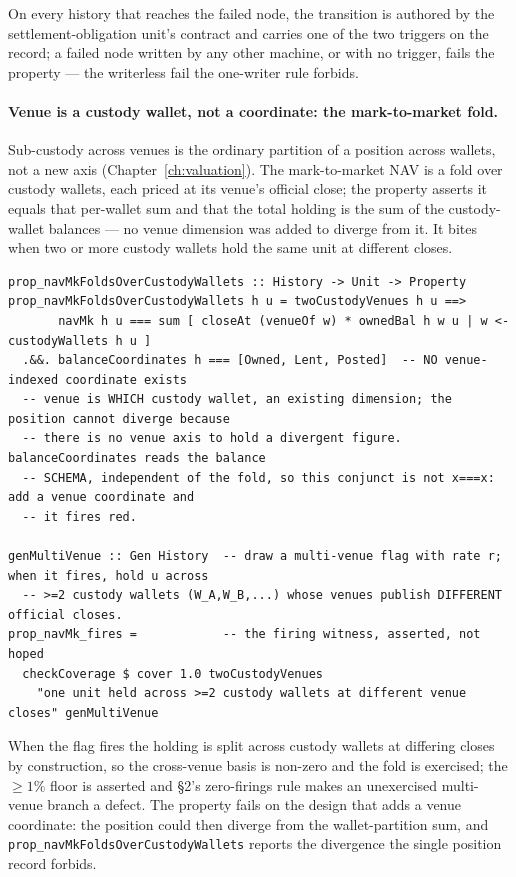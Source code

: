 On every history that reaches the failed node, the transition is authored by the
settlement-obligation unit's contract and carries one of the two triggers on the record; a failed
node written by any other machine, or with no trigger, fails the property --- the writerless fail the
one-writer rule forbids.

\paragraph{Venue is a custody wallet, not a coordinate: the mark-to-market fold.}
Sub-custody across venues is the ordinary partition of a position across wallets, not a new axis
(Chapter~\ref{ch:valuation}). The mark-to-market NAV is a fold over custody wallets, each priced at
its venue's official close; the property asserts it equals that per-wallet sum and that the total
holding is the sum of the custody-wallet balances --- no venue dimension was added to diverge from
it. It bites when two or more custody wallets hold the same unit at different closes.

\begin{lstlisting}
prop_navMkFoldsOverCustodyWallets :: History -> Unit -> Property
prop_navMkFoldsOverCustodyWallets h u = twoCustodyVenues h u ==>
       navMk h u === sum [ closeAt (venueOf w) * ownedBal h w u | w <- custodyWallets h u ]
  .&&. balanceCoordinates h === [Owned, Lent, Posted]  -- NO venue-indexed coordinate exists
  -- venue is WHICH custody wallet, an existing dimension; the position cannot diverge because
  -- there is no venue axis to hold a divergent figure. balanceCoordinates reads the balance
  -- SCHEMA, independent of the fold, so this conjunct is not x===x: add a venue coordinate and
  -- it fires red.

genMultiVenue :: Gen History  -- draw a multi-venue flag with rate r; when it fires, hold u across
  -- >=2 custody wallets (W_A,W_B,...) whose venues publish DIFFERENT official closes.
prop_navMk_fires =            -- the firing witness, asserted, not hoped
  checkCoverage $ cover 1.0 twoCustodyVenues
    "one unit held across >=2 custody wallets at different venue closes" genMultiVenue
\end{lstlisting}

When the flag fires the holding is split across custody wallets at differing closes by construction,
so the cross-venue basis is non-zero and the fold is exercised; the $\ge 1\%$ floor is asserted and
\S 2's zero-firings rule makes an unexercised multi-venue branch a defect. The property fails on the
design that adds a venue coordinate: the position could then diverge from the wallet-partition sum,
and \texttt{prop\_navMkFoldsOverCustodyWallets} reports the divergence the single position record
forbids.


